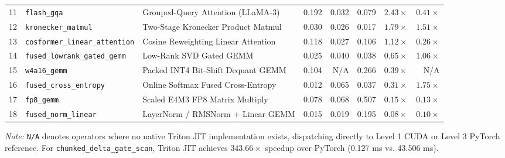 \begin{table}[t]
\begin{tabular}{rllrrrrr}
11 & \texttt{flash\_gqa} & Grouped-Query Attention (LLaMA-3) & 0.192 & 0.032 & 0.079 & $\mathbf{2.43\times}$ & $0.41\times$ \\
12 & \texttt{kronecker\_matmul} & Two-Stage Kronecker Product Matmul & 0.030 & 0.026 & 0.017 & $\mathbf{1.79\times}$ & $\mathbf{1.51\times}$ \\
13 & \texttt{cosformer\_linear\_attention} & Cosine Reweighting Linear Attention & 0.118 & 0.027 & 0.106 & $\mathbf{1.12\times}$ & $0.26\times$ \\
14 & \texttt{fused\_lowrank\_gated\_gemm} & Low-Rank SVD Gated GEMM & 0.025 & 0.040 & 0.038 & $0.65\times$ & $\mathbf{1.06\times}$ \\
15 & \texttt{w4a16\_gemm} & Packed INT4 Bit-Shift Dequant GEMM & 0.104 & N/A & 0.266 & $0.39\times$ & N/A \\
16 & \texttt{fused\_cross\_entropy} & Online Softmax Fused Cross-Entropy & 0.012 & 0.065 & 0.037 & $0.31\times$ & $\mathbf{1.75\times}$ \\
17 & \texttt{fp8\_gemm} & Scaled E4M3 FP8 Matrix Multiply & 0.078 & 0.068 & 0.507 & $0.15\times$ & $0.13\times$ \\
18 & \texttt{fused\_norm\_linear} & LayerNorm / RMSNorm + Linear GEMM & 0.015 & 0.019 & 0.195 & $0.08\times$ & $0.10\times$ \\
\bottomrule
\end{tabular}
\par\vspace{2pt}\raggedright\scriptsize \textit{Note:} \texttt{N/A} denotes operators where no native Triton JIT implementation exists, dispatching directly to Level 1 CUDA or Level 3 PyTorch reference. For \texttt{chunked\_delta\_gate\_scan}, Triton JIT achieves $\mathbf{343.66\times}$ speedup over PyTorch (0.127 ms vs. 43.506 ms).
\end{table}
